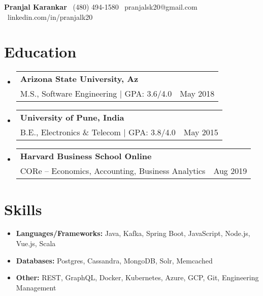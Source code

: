 \documentclass[a4paper,10pt]{article}
\makeatletter
\newcommand{\resumeItem}[1]{\item #1}
\newcommand{\resumeSubheading}[4]{
  \vspace{-1pt}\item[]
    \begin{tabular*}{\textwidth}[t]{l@{\extracolsep{\fill}}r}
      \textbf{#1} & #2 \\
      \vspace{2pt}
      {#3} & {#4} \\
    \end{tabular*}\vspace{-5pt}
}
\makeatother
\begin{document}
{\LARGE \textbf{Pranjal Karankar}}
\hfill
\raisebox{-0.1\height} {\large \faPhoneSquare}\ (480) 494-1580 \hfill
\raisebox{-0.1\height}{\large \faEnvelopeSquare}\ pranjalsk20@gmail.com \hfill
\raisebox{-0.1\height}{\large \faLinkedinSquare}\ linkedin.com/in/pranjalk20

\section{Education}
\begin{itemize}[leftmargin=0.15in, label={}]
    \resumeSubheading{Arizona State University, Az}{}{M.S., Software Engineering $|$ GPA: 3.6/4.0}{May 2018}
    \resumeSubheading{University of Pune, India}{}{B.E., Electronics \& Telecom $|$  GPA: 3.8/4.0}{May 2015}
    \resumeSubheading{Harvard Business School Online}{}{CORe – Economics, Accounting, Business Analytics}{Aug 2019}
\end{itemize}

\section{Skills}
\begin{itemize}[leftmargin=0.15in, label={}]
     \resumeItem{\textbf{Languages/Frameworks:} Java, Kafka, Spring Boot, JavaScript, Node.js, Vue.js, Scala}
    \resumeItem{\textbf{Databases:} Postgres, Cassandra, MongoDB, Solr, Memcached}
    \resumeItem{\textbf{Other:} REST, GraphQL, Docker, Kubernetes, Azure, GCP, Git, Engineering Management}

\end{itemize}

\end{document}
